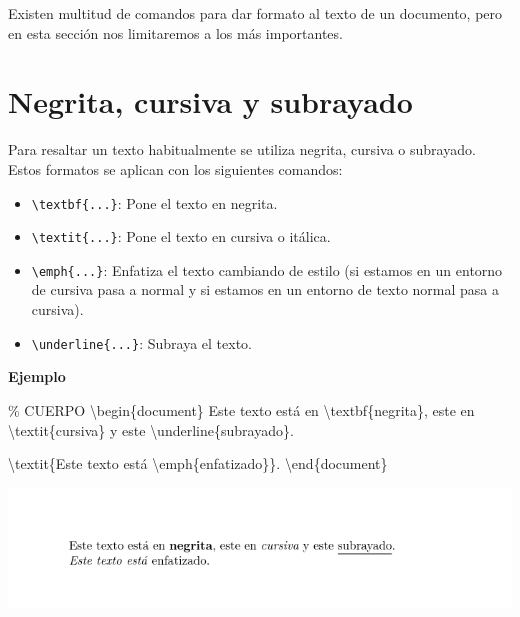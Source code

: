 \documentclass[
  a4paper,
]{scrreport}
\newenvironment{Shaded}{\begin{snugshade}}{\end{snugshade}}
\newcommand{\CommentTok}[1]{\textcolor[rgb]{0.37,0.37,0.37}{#1}}
\newcommand{\ExtensionTok}[1]{\textcolor[rgb]{0.00,0.23,0.31}{#1}}
\newcommand{\FunctionTok}[1]{\textcolor[rgb]{0.28,0.35,0.67}{#1}}
\newcommand{\KeywordTok}[1]{\textcolor[rgb]{0.00,0.23,0.31}{#1}}
\newcommand{\NormalTok}[1]{\textcolor[rgb]{0.00,0.23,0.31}{#1}}
\providecommand{\tightlist}{%
  \setlength{\itemsep}{0pt}\setlength{\parskip}{0pt}}\usepackage{longtable,booktabs,array}
\begin{document}
Existen multitud de comandos para dar formato al texto de un documento,
pero en esta sección nos limitaremos a los más importantes.

\hypertarget{negrita-cursiva-y-subrayado}{%
\section{Negrita, cursiva y
subrayado}\label{negrita-cursiva-y-subrayado}}

Para resaltar un texto habitualmente se utiliza negrita, cursiva o
subrayado. Estos formatos se aplican con los siguientes comandos:

\begin{itemize}
\tightlist
\item
  \texttt{\textbackslash{}textbf\{...\}}: Pone el texto en negrita.
\item
  \texttt{\textbackslash{}textit\{...\}}: Pone el texto en cursiva o
  itálica.
\item
  \texttt{\textbackslash{}emph\{...\}}: Enfatiza el texto cambiando de
  estilo (si estamos en un entorno de cursiva pasa a normal y si estamos
  en un entorno de texto normal pasa a cursiva).
\item
  \texttt{\textbackslash{}underline\{...\}}: Subraya el texto.
\end{itemize}

\textbf{Ejemplo}

\begin{Shaded}
\begin{Highlighting}[]
\CommentTok{\% CUERPO}
\KeywordTok{\textbackslash{}begin}\NormalTok{\{}\ExtensionTok{document}\NormalTok{\}}
\NormalTok{Este texto está en }\FunctionTok{\textbackslash{}textbf}\NormalTok{\{negrita\}, este en }\FunctionTok{\textbackslash{}textit}\NormalTok{\{cursiva\} y este }
\FunctionTok{\textbackslash{}underline}\NormalTok{\{subrayado\}. }

\FunctionTok{\textbackslash{}textit}\NormalTok{\{Este texto está }\FunctionTok{\textbackslash{}emph}\NormalTok{\{enfatizado\}\}.}
\KeywordTok{\textbackslash{}end}\NormalTok{\{}\ExtensionTok{document}\NormalTok{\}}
\end{Highlighting}
\end{Shaded}

\begin{tcolorbox}[enhanced jigsaw, bottomrule=.15mm, leftrule=.75mm, opacityback=0, titlerule=0mm, bottomtitle=1mm, colbacktitle=quarto-callout-note-color!10!white, arc=.35mm, toprule=.15mm, colframe=quarto-callout-note-color-frame, title={Salida}, coltitle=black, colback=white, breakable, toptitle=1mm, rightrule=.15mm, left=2mm, opacitybacktitle=0.6]

\includegraphics{./img/formateo/resaltado.png}

\end{tcolorbox}
\end{document}

